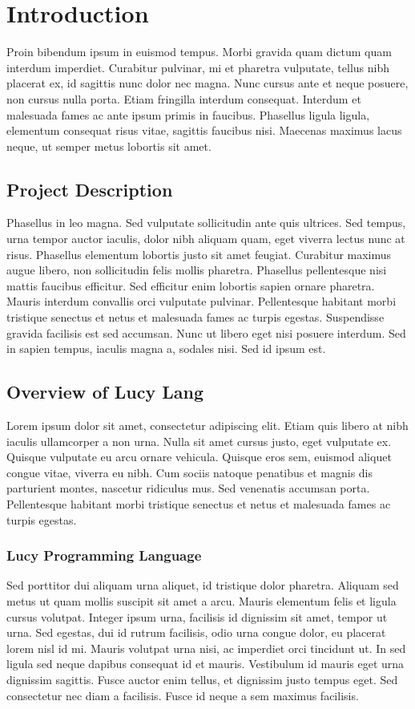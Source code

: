 \chapter{Introduction}
Proin bibendum ipsum in euismod tempus. Morbi gravida quam dictum quam interdum imperdiet. Curabitur pulvinar, mi et pharetra vulputate, tellus nibh placerat ex, id sagittis nunc dolor nec magna. Nunc cursus ante et neque posuere, non cursus nulla porta. Etiam fringilla interdum consequat. Interdum et malesuada fames ac ante ipsum primis in faucibus. Phasellus ligula ligula, elementum consequat risus vitae, sagittis faucibus nisi. Maecenas maximus lacus neque, ut semper metus lobortis sit amet.


\section{Project Description}
Phasellus in leo magna. Sed vulputate sollicitudin ante quis ultrices. Sed tempus, urna tempor auctor iaculis, dolor nibh aliquam quam, eget viverra lectus nunc at risus. Phasellus elementum lobortis justo sit amet feugiat. Curabitur maximus augue libero, non sollicitudin felis mollis pharetra. Phasellus pellentesque nisi mattis faucibus efficitur. Sed efficitur enim lobortis sapien ornare pharetra. Mauris interdum convallis orci vulputate pulvinar. Pellentesque habitant morbi tristique senectus et netus et malesuada fames ac turpis egestas. Suspendisse gravida facilisis est sed accumsan. Nunc ut libero eget nisi posuere interdum. Sed in sapien tempus, iaculis magna a, sodales nisi. Sed id ipsum est.


\section{Overview of Lucy Lang}
Lorem ipsum dolor sit amet, consectetur adipiscing elit. Etiam quis libero at nibh iaculis ullamcorper a non urna. Nulla sit amet cursus justo, eget vulputate ex. Quisque vulputate eu arcu ornare vehicula. Quisque eros sem, euismod aliquet congue vitae, viverra eu nibh. Cum sociis natoque penatibus et magnis dis parturient montes, nascetur ridiculus mus. Sed venenatis accumsan porta. Pellentesque habitant morbi tristique senectus et netus et malesuada fames ac turpis egestas.

\subsection{Lucy Programming Language}
Sed porttitor dui aliquam urna aliquet, id tristique dolor pharetra. Aliquam sed metus ut quam mollis suscipit sit amet a arcu. Mauris elementum felis et ligula cursus volutpat. Integer ipsum urna, facilisis id dignissim sit amet, tempor ut urna. Sed egestas, dui id rutrum facilisis, odio urna congue dolor, eu placerat lorem nisl id mi. Mauris volutpat urna nisi, ac imperdiet orci tincidunt ut. In sed ligula sed neque dapibus consequat id et mauris. Vestibulum id mauris eget urna dignissim sagittis. Fusce auctor enim tellus, et dignissim justo tempus eget. Sed consectetur nec diam a facilisis. Fusce id neque a sem maximus facilisis.

